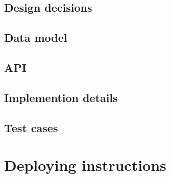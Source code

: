 \documentclass{article}
\begin{document}
\subsection{Design decisions}
\subsection{Data model}
\subsection{API}
\subsection{Implemention details}
\subsection{Test cases}

\section{Deploying instructions}
\end{document}

